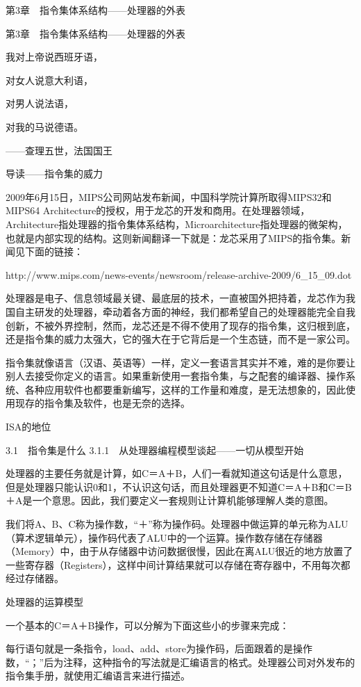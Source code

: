 \documentclass[12pt,UTF8]{ctexbook}
\begin{document}
第3章　指令集体系结构——处理器的外表

第3章　指令集体系结构——处理器的外表

我对上帝说西班牙语，

对女人说意大利语，

对男人说法语，

对我的马说德语。

——查理五世，法国国王



导读——指令集的威力

2009年6月15日，MIPS公司网站发布新闻，中国科学院计算所取得MIPS32和MIPS64 Architecture的授权，用于龙芯的开发和商用。在处理器领域，Architecture指处理器的指令集体系结构，Microarchitecture指处理器的微架构，也就是内部实现的结构。这则新闻翻译一下就是：龙芯采用了MIPS的指令集。新闻见下面的链接：

http://www.mips.com/news-events/newsroom/release-archive-2009/6\_15\_09.dot

处理器是电子、信息领域最关键、最底层的技术，一直被国外把持着，龙芯作为我国自主研发的处理器，牵动着各方面的神经，我们都希望自己的处理器能完全自我创新，不被外界控制，然而，龙芯还是不得不使用了现存的指令集，这归根到底，还是指令集的威力太强大，它的强大在于它背后是一个生态链，而不是一家公司。

指令集就像语言（汉语、英语等）一样，定义一套语言其实并不难，难的是你要让别人去接受你定义的语言。如果重新使用一套指令集，与之配套的编译器、操作系统、各种应用软件也都要重新编写，这样的工作量和难度，是无法想象的，因此使用现存的指令集及软件，也是无奈的选择。

ISA的地位


3.1　指令集是什么
3.1.1　从处理器编程模型谈起——一切从模型开始

处理器的主要任务就是计算，如C＝A＋B，人们一看就知道这句话是什么意思，但是处理器只能认识0和1，不认识这句话，而且处理器更不知道C＝A＋B和C＝B＋A是一个意思。因此，我们要定义一套规则让计算机能够理解人类的意图。

我们将A、B、C称为操作数，“＋”称为操作码。处理器中做运算的单元称为ALU（算术逻辑单元），操作码代表了ALU中的一个运算。操作数存储在存储器（Memory）中，由于从存储器中访问数据很慢，因此在离ALU很近的地方放置了一些寄存器（Registers），这样中间计算结果就可以存储在寄存器中，不用每次都经过存储器。

处理器的运算模型

一个基本的C＝A＋B操作，可以分解为下面这些小的步骤来完成：

每行语句就是一条指令，load、add、store为操作码，后面跟着的是操作数，“；”后为注释，这种指令的写法就是汇编语言的格式。处理器公司对外发布的指令集手册，就使用汇编语言来进行描述。
\end{document}
